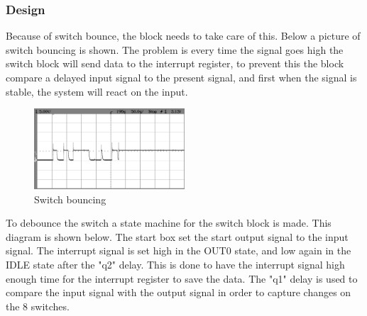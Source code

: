 \subsubsection{Design}
%
%
Because of switch bounce, the block needs to take care of this. Below a picture of switch bouncing is shown. The problem is every time the signal goes high the switch block will send data to the interrupt register, to prevent this the block compare a delayed input signal to the present signal, and first when the signal is stable, the system will react on the input.

\begin{figure}[H]
	\begin{centering}
		\includegraphics[width=0.5\textwidth]{images/tb6_bounce.png}
		\caption{Switch bouncing}
	\end{centering}
\end{figure}

To debounce the switch a state machine for the switch block is made. This diagram is shown below. The start box set the start output signal to the input signal. The interrupt signal is set high in the OUT0 state, and low again in the IDLE state after the "q2" delay. This is done to have the interrupt signal high enough time for the interrupt register to save the data. The "q1" delay is used to compare the input signal with the output signal in order to capture changes on the 8 switches.

